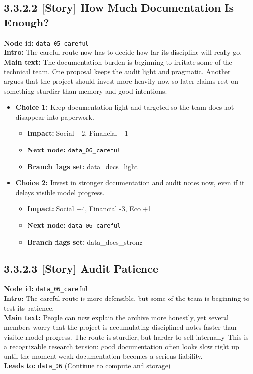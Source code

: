 \documentclass[11pt]{article}
\begin{document}
\subsection*{3.3.2.2 [Story] How Much Documentation Is Enough?}
\textbf{Node id:} \texttt{data\_05\_careful}\\
\textbf{Intro:} The careful route now has to decide how far its discipline will really go.\\
\textbf{Main text:} The documentation burden is beginning to irritate some of the technical team. One proposal keeps the audit light and pragmatic. Another argues that the project should invest more heavily now so later claims rest on something sturdier than memory and good intentions.\\
\begin{itemize}
\item \textbf{Choice 1:} Keep documentation light and targeted so the team does not disappear into paperwork.
\begin{itemize}
\item \textbf{Impact:} Social +2, Financial +1
\item \textbf{Next node:} \texttt{data\_06\_careful}
\item \textbf{Branch flags set:} data\_docs\_light
\end{itemize}
\item \textbf{Choice 2:} Invest in stronger documentation and audit notes now, even if it delays visible model progress.
\begin{itemize}
\item \textbf{Impact:} Social +4, Financial -3, Eco +1
\item \textbf{Next node:} \texttt{data\_06\_careful}
\item \textbf{Branch flags set:} data\_docs\_strong
\end{itemize}
\end{itemize}
\subsection*{3.3.2.3 [Story] Audit Patience}
\textbf{Node id:} \texttt{data\_06\_careful}\\
\textbf{Intro:} The careful route is more defensible, but some of the team is beginning to test its patience.\\
\textbf{Main text:} People can now explain the archive more honestly, yet several members worry that the project is accumulating disciplined notes faster than visible model progress. The route is sturdier, but harder to sell internally. This is a recognizable research tension: good documentation often looks slow right up until the moment weak documentation becomes a serious liability.\\
\textbf{Leads to:} \texttt{data\_06} (Continue to compute and storage)\\
\end{document}
